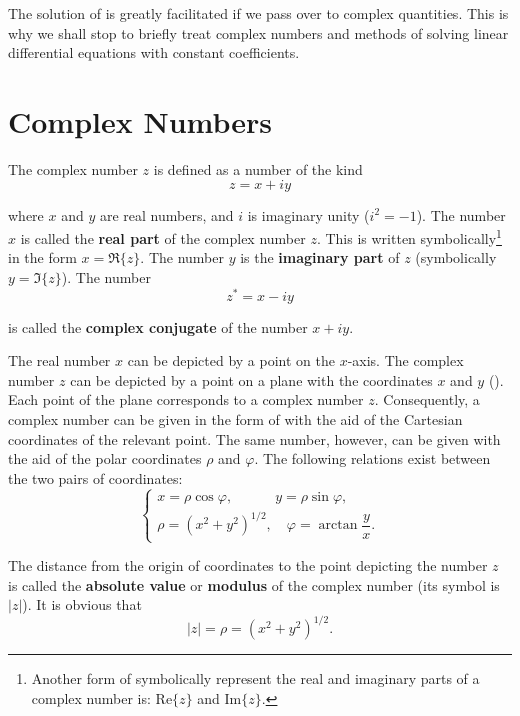 The solution of  is greatly facilitated if we pass over to complex quantities. This is why we shall stop to briefly treat complex numbers and methods of solving linear differential equations with constant coefficients.

\section{Complex Numbers}\label{sec:7_3}

The complex number $z$ is defined as a number of the kind
\begin{equation}\label{eq:7_16}
	z = x + iy
\end{equation}

\noindent
where $x$ and $y$ are real numbers, and $i$ is imaginary unity ($i^2=-1$). The number $x$ is called the \textbf{real part} of the complex number $z$. This is written symbolically\footnote{Another form of symbolically represent the real and imaginary parts of a complex number is: $\mathrm{Re}\{z\}$ and $\mathrm{Im}\{z\}$.} in the form $x=\Re\{z\}$. The number $y$ is the \textbf{imaginary part} of $z$ (symbolically $y=\Im\{z\}$). The number
\begin{equation}\label{eq:7_17}
	z^* = x - iy
\end{equation}

\noindent
is called the \textbf{complex conjugate} of the number $x+iy$.

The real number $x$ can be depicted by a point on the $x$-axis. The complex number $z$ can be depicted by a point on a plane with the coordinates $x$ and $y$ (). Each point of the plane corresponds to a complex number $z$. Consequently, a complex number can be given in the form of  with the aid of the Cartesian coordinates of the relevant point. The same number, however, can be given with the aid of the polar coordinates $\rho$ and $\varphi$. The following relations exist between the two pairs of coordinates:
\begin{equation}\label{eq:7_18}
	\begin{cases}
		x = \rho\cos\varphi,\quad\quad\quad y = \rho\sin\varphi,\\
		\rho = \left(x^2+y^2\right)^{1/2},\quad \varphi = \arctan\dfrac{y}{x}.
	\end{cases}
\end{equation}

The distance from the origin of coordinates to the point depicting the number $z$ is called the \textbf{absolute value} or \textbf{modulus} of the complex number (its symbol is $|z|$). It is obvious that
\begin{equation}\label{eq:7_19}
	|z| = \rho = \left(x^2+y^2\right)^{1/2}.
\end{equation}

